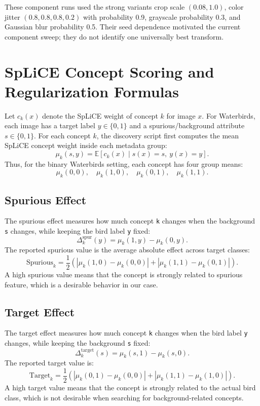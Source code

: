 \documentclass[11pt,a4paper]{article}
\begin{document}
These component runs used the strong variants crop scale $(0.08,1.0)$, color
jitter $(0.8,0.8,0.8,0.2)$ with probability 0.9, grayscale probability 0.3,
and Gaussian blur probability 0.5. Their seed dependence motivated the current
component sweep; they do not identify one universally best transform.

\FloatBarrier

\section{SpLiCE Concept Scoring and Regularization Formulas}

Let \(c_k(x)\) denote the SpLiCE weight of concept \(k\) for image \(x\).
For Waterbirds, each image has a target label $ y \in \{0,1\}$
and a spurious/background attribute $ s \in \{0,1\}. $
For each concept \(k\), the discovery script first computes the mean SpLiCE concept weight inside each metadata group:
\[
\mu_k(s,y)
=
\mathbb{E}\left[c_k(x)\mid s(x)=s,\ y(x)=y\right].
\]
Thus, for the binary Waterbirds setting, each concept has four group means:
\[
\mu_k(0,0),\quad
\mu_k(1,0),\quad
\mu_k(0,1),\quad
\mu_k(1,1).
\]

\subsection{Spurious Effect}

The spurious effect measures how much concept \texttt{k} changes when the background \texttt{s} changes, while keeping the bird label \texttt{y} fixed:
\[
\Delta^{\mathrm{spur}}_k(y)
=
\mu_k(1,y)-\mu_k(0,y).
\]
The reported spurious value is the average absolute effect across target classes:
\[
\mathrm{Spurious}_k
=
\frac{1}{2}
\left(
\left|\mu_k(1,0)-\mu_k(0,0)\right|
+
\left|\mu_k(1,1)-\mu_k(0,1)\right|
\right).
\]
A high spurious value means that the concept is strongly related to spurious feature, which is a desirable behavior in our case.
\subsection{Target Effect}

The target effect measures how much concept \texttt{k} changes when the bird label \texttt{y} changes, while keeping the background \texttt{s} fixed:
\[
\Delta^{\mathrm{target}}_k(s)
=
\mu_k(s,1)-\mu_k(s,0).
\]
The reported target value is:
\[
\mathrm{Target}_k
=
\frac{1}{2}
\left(
\left|\mu_k(0,1)-\mu_k(0,0)\right|
+
\left|\mu_k(1,1)-\mu_k(1,0)\right|
\right).
\]
A high target value means that the concept is strongly related to the actual bird class, which is not desirable when searching for background-related concepts.
\end{document}
